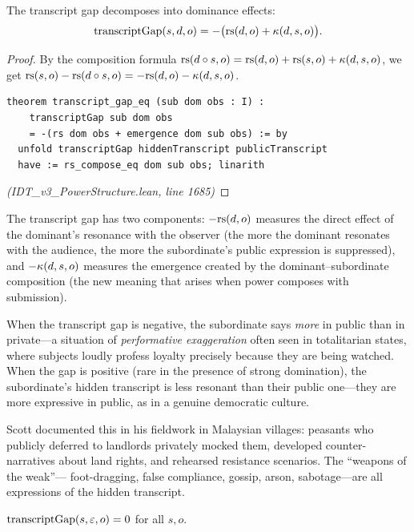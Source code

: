 \begin{theorem}
\label{thm:transcript-gap}
The transcript gap decomposes into dominance effects:
\[
  \mathrm{transcriptGap}(s, d, o) = -\big(\mathrm{rs}(d, o) + \kappa(d, s, o)\big).
\]
\end{theorem}

\begin{proof}
By the composition formula $\mathrm{rs}(d \circ s, o) = \mathrm{rs}(d, o) + \mathrm{rs}(s, o) + \kappa(d, s, o)$,
we get $\mathrm{rs}(s, o) - \mathrm{rs}(d \circ s, o) = -\mathrm{rs}(d, o) - \kappa(d, s, o)$.
\begin{lstlisting}
theorem transcript_gap_eq (sub dom obs : I) :
    transcriptGap sub dom obs
    = -(rs dom obs + emergence dom sub obs) := by
  unfold transcriptGap hiddenTranscript publicTranscript
  have := rs_compose_eq dom sub obs; linarith
\end{lstlisting}
\textit{(IDT\_v3\_PowerStructure.lean, line 1685)}
\end{proof}

\begin{interpretation}
The transcript gap has two components: $-\mathrm{rs}(d, o)$ measures the direct effect
of the dominant's resonance with the observer (the more the dominant resonates
with the audience, the more the subordinate's public expression is suppressed),
and $-\kappa(d, s, o)$ measures the emergence created by the dominant--subordinate
composition (the new meaning that arises when power composes with submission).

When the transcript gap is negative, the subordinate says \emph{more} in public
than in private---a situation of \emph{performative exaggeration} often seen
in totalitarian states, where subjects loudly profess loyalty precisely because
they are being watched. When the gap is positive (rare in the presence of
strong domination), the subordinate's hidden transcript is less resonant than
their public one---they are more expressive in public, as in a genuine
democratic culture.

Scott documented this in his fieldwork in Malaysian villages: peasants who
publicly deferred to landlords privately mocked them, developed counter-narratives
about land rights, and rehearsed resistance scenarios. The ``weapons of the weak''---
foot-dragging, false compliance, gossip, arson, sabotage---are all expressions
of the hidden transcript.
\end{interpretation}

\begin{theorem}
\label{thm:transcript-void-dom}
$\mathrm{transcriptGap}(s, \varepsilon, o) = 0$ for all $s, o$.
\end{theorem}

